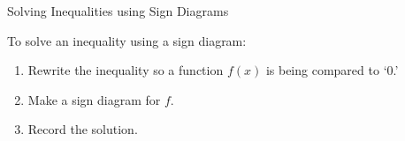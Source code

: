 \begin{floatbox}[label=box:solvinginequalitiesusingsigndiagram]{Solving Inequalities using Sign Diagrams}


To solve an inequality using a sign diagram:

\begin{enumerate}

\item  Rewrite the inequality so a function $f(x)$ is being compared to `$0$.'

\item  Make a sign diagram for $f$.

\item  Record the solution.

\end{enumerate}

\end{floatbox}

